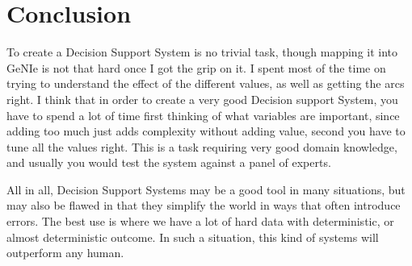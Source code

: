 \section{Conclusion}
To create a Decision Support System is no trivial task, though mapping it into
GeNIe is not that hard once I got the grip on it. I spent most of the time
on trying to understand the effect of the different values, as well as getting
the arcs right. I think that in order to create a very good Decision support
System, you have to spend a lot of time first thinking of what variables are
important, since adding too much just adds complexity without adding value,
second you have to tune all the values right. This is a task requiring very good
domain knowledge, and usually you would test the system against a panel of
experts.

All in all, Decision Support Systems may be a good tool in many situations, but
may also be flawed in that they simplify the world in ways that often introduce
errors. The best use is where we have a lot of hard data with deterministic, or
almost deterministic outcome. In such a situation, this kind of systems will
outperform any human.
